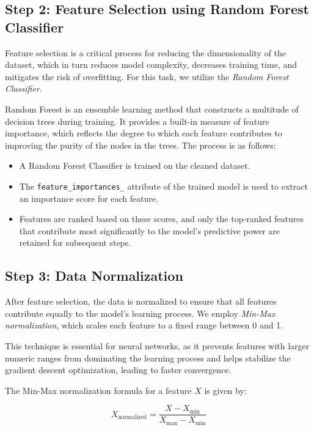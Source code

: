\documentclass[12pt]{report}
\begin{document}
\subsection{Step 2: Feature Selection using Random Forest Classifier}

Feature selection is a critical process for reducing the dimensionality of the dataset, which in turn reduces model complexity, decreases training time, and mitigates the risk of overfitting. For this task, we utilize the \textit{Random Forest Classifier}.

Random Forest is an ensemble learning method that constructs a multitude of decision trees during training. It provides a built-in measure of feature importance, which reflects the degree to which each feature contributes to improving the purity of the nodes in the trees. The process is as follows:

\begin{itemize}
    \item A Random Forest Classifier is trained on the cleaned dataset.
    
    \item The \texttt{feature\_importances\_} attribute of the trained model is used to extract an importance score for each feature.
    
    \item Features are ranked based on these scores, and only the top-ranked features that contribute most significantly to the model’s predictive power are retained for subsequent steps.
\end{itemize}

\subsection{Step 3: Data Normalization}


After feature selection, the data is normalized to ensure that all features contribute equally to the model’s learning process. We employ \textit{Min-Max normalization}, which scales each feature to a fixed range between 0 and 1.

This technique is essential for neural networks, as it prevents features with larger numeric ranges from dominating the learning process and helps stabilize the gradient descent optimization, leading to faster convergence.

The Min-Max normalization formula for a feature \( X \) is given by:

\[
X_{\text{normalized}} = \frac{X - X_{\min}}{X_{\max} - X_{\min}}
\]
\end{document}
